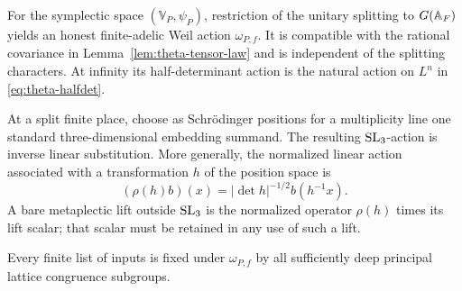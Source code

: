 \begin{lemma}\label{lem:unitary-splitting}
For the symplectic space \((\mathbb V_P,\psi_P)\), restriction of
the unitary splitting to \(G(\mathbb{A}_F)\) yields an honest finite-adelic
Weil action \(\omega_{P,f}\).  It is compatible with the rational
covariance in Lemma~\ref{lem:theta-tensor-law} and is independent
of the splitting characters.  At infinity its half-determinant
action is the natural action on \(L^n\) in
\eqref{eq:theta-halfdet}.

At a split finite place, choose as Schr\"odinger positions for a
multiplicity line one standard three-dimensional embedding
summand.  The resulting \(\operatorname{SL}_3\)-action is inverse linear
substitution.  More generally, the normalized linear action
associated with a transformation \(h\) of the position space is
\begin{equation}\label{eq:theta-linear-action}
 (\rho(h)b)(x)=|\det h|^{-1/2}b(h^{-1}x).
\end{equation}
A bare metaplectic lift outside \(\operatorname{SL}_3\) is the normalized
operator \(\rho(h)\) times its lift scalar; that scalar must be
retained in any use of such a lift.

Every finite list of inputs is fixed under \(\omega_{P,f}\) by
all sufficiently deep principal lattice congruence subgroups.
\end{lemma}

